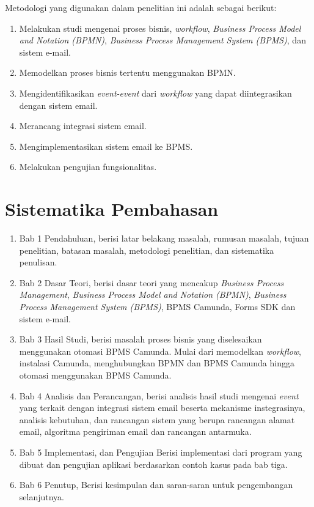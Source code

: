 Metodologi yang digunakan dalam penelitian ini adalah sebagai berikut:
\begin{enumerate}
	\item Melakukan studi mengenai proses bisnis, \textit{workflow}, \textit{Business Process Model and Notation (BPMN)}, \textit{Business Process Management System (BPMS)}, dan sistem e-mail. 
	\item Memodelkan proses bisnis tertentu menggunakan BPMN.
	\item Mengidentifikasikan \textit{event-event} dari \textit{workflow} yang dapat diintegrasikan dengan sistem email.
	\item Merancang integrasi sistem email.
	\item Mengimplementasikan sistem email ke BPMS.
	\item Melakukan pengujian fungsionalitas.
\end{enumerate}




\section{Sistematika Pembahasan}
\label{sec:sispem}

\begin{enumerate}
	\item Bab 1 Pendahuluan, berisi latar belakang masalah, rumusan masalah, tujuan penelitian, batasan masalah, metodologi penelitian, dan sistematika penulisan.
	\item Bab 2 Dasar Teori, berisi dasar teori yang mencakup \textit{Business Process Management}, \textit{Business Process Model and Notation (BPMN)}, \textit{Business Process Management System (BPMS)}, BPMS Camunda, Forms SDK dan sistem e-mail.
	\item Bab 3 Hasil Studi, berisi masalah proses bisnis yang diselesaikan menggunakan otomasi BPMS Camunda. Mulai dari memodelkan \textit{workflow}, instalasi Camunda, menghubungkan BPMN dan BPMS Camunda hingga otomasi menggunakan BPMS Camunda.
	\item Bab 4 Analisis dan Perancangan, berisi analisis hasil studi mengenai \textit{event} yang terkait dengan integrasi sistem email beserta mekanisme instegrasinya, analisis kebutuhan, dan rancangan sistem yang berupa rancangan alamat email, algoritma pengiriman email dan rancangan antarmuka.
	\item Bab 5 Implementasi, dan Pengujian Berisi implementasi dari program yang dibuat dan pengujian aplikasi berdasarkan contoh kasus pada bab tiga.
	\item Bab 6 Penutup, Berisi kesimpulan dan saran-saran untuk pengembangan selanjutnya.
\end{enumerate}


